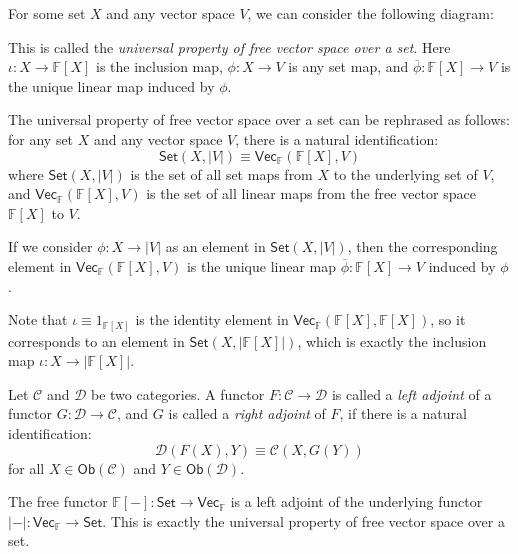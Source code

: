 \documentclass[
	11pt, %
	fleqn, %
	a4paper, %
]{LegrandOrangeBook}
\renewcommand{\bar}[1]{\overline{#1}} %
\newcommand{\F}{\mathbb{F}} %
\newcommand{\C}{\mathcal{C}} %
\newcommand{\D}{\mathcal{D}} %
\newcommand{\Set}{\boldsymbol{\mathsf{Set}}} %
\newcommand{\Vect}{\boldsymbol{\mathsf{Vec}}} %
\newcommand{\Ob}[1]{\mathsf{Ob}(#1)} %
\begin{document}
For some set $X$ and any vector space $V$, we can consider the following diagram:
\begin{center}
\end{center}
This is called the \emph{universal property of free vector space over a set}. Here $\iota : X \to \F[X]$ is the inclusion map, $\phi : X \to V$ is any set map, and $\bar{\phi} : \F[X] \to V$ is the unique linear map induced by $\phi$.

\begin{remark}
    The universal property of free vector space over a set can be rephrased as follows: for any set $X$ and any vector space $V$, there is a natural identification:
    \[
        \Set(X, |V|) \equiv \Vect_{\F}(\F[X], V)
    \]
    where $\Set(X, |V|)$ is the set of all set maps from $X$ to the underlying set of $V$, and $\Vect_{\F}(\F[X], V)$ is the set of all linear maps from the free vector space $\F[X]$ to $V$.
    
    If we consider $\phi : X \to |V|$ as an element in $\Set(X, |V|)$, then the corresponding element in $\Vect_{\F}(\F[X], V)$ is the unique linear map $\bar{\phi} : \F[X] \to V$ induced by $\phi$.

    Note that $\iota \equiv 1_{\F[X]}$ is the identity element in $\Vect_{\F}(\F[X], \F[X])$, so it corresponds to an element in $\Set(X, |\F[X]|)$, which is exactly the inclusion map $\iota : X \to |\F[X]|$.
\end{remark}

\begin{definition}
    Let $\C$ and $\D$ be two categories. A functor $F : \C \to \D$ is called a \emph{left adjoint} of a functor $G : \D \to \C$, and $G$ is called a \emph{right adjoint} of $F$, if there is a natural identification:
    \[
        \D(F(X), Y) \equiv \C(X, G(Y))
    \]
    for all $X \in \Ob{\C}$ and $Y \in \Ob{\D}$.
\end{definition}

\begin{example}
    The free functor $\F[-] : \Set \to \Vect_{\F}$ is a left adjoint of the underlying functor $|-| : \Vect_{\F} \to \Set$. This is exactly the universal property of free vector space over a set.
\end{example}
\end{document}
